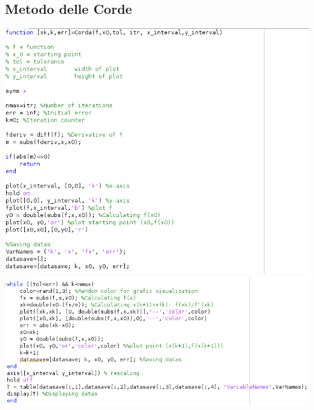 \documentclass[12pt, letterpaper]{article}
\begin{document}
\subsection{Metodo delle Corde}
\includegraphics[scale=0.86]{ProgrammaCorda1.png}\\
\includegraphics[scale=0.86]{ProgrammaCorda2.png}
\newpage
\end{document}
